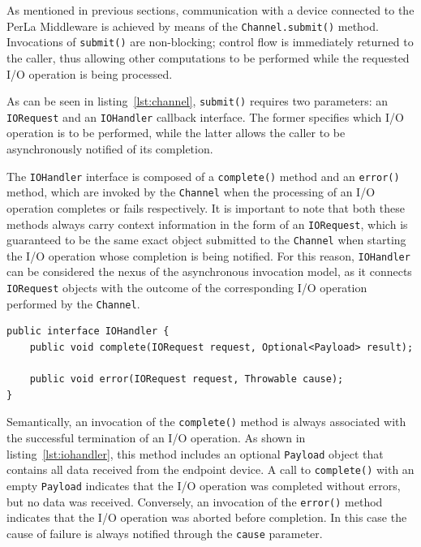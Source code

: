As mentioned in previous sections, communication with a device connected to the PerLa Middleware is achieved by means of the \texttt{Channel.submit()} method. Invocations of \texttt{submit()} are non-blocking; control flow is immediately returned to the caller, thus allowing other computations to be performed while the requested I/O operation is being processed.

As can be seen in listing~\ref{lst:channel}, \texttt{submit()} requires two parameters: an \texttt{IORequest} and an \texttt{IOHandler} callback interface. The former specifies which I/O operation is to be performed, while the latter allows the caller to be asynchronously notified of its completion.

The \texttt{IOHandler} interface is composed of a \texttt{complete()} method and an \texttt{error()} method, which are invoked by the \texttt{Channel} when the processing of an I/O operation completes or fails respectively. It is important to note that both these methods always carry context information in the form of an \texttt{IORequest}, which is guaranteed to be the same exact object submitted to the \texttt{Channel} when starting the I/O operation whose completion is being notified. For this reason, \texttt{IOHandler} can be considered the nexus of the asynchronous invocation model, as it connects \texttt{IORequest} objects with the outcome of the corresponding I/O operation performed by the \texttt{Channel}.

\lstset{language=Java}
\begin{lstlisting}[float,floatplacement=H,caption=The IOHandler interface,label={lst:iohandler}]
public interface IOHandler {
	public void complete(IORequest request, Optional<Payload> result);
	
	public void error(IORequest request, Throwable cause);
}
\end{lstlisting}

Semantically, an invocation of the \texttt{complete()} method is always associated with the successful termination of an I/O operation. As shown in listing~\ref{lst:iohandler}, this method includes an optional \texttt{Payload} object that contains all data received from the endpoint device. A call to \texttt{complete()} with an empty \texttt{Payload} indicates that the I/O operation was completed without errors, but no data was received. Conversely, an invocation of the \texttt{error()} method indicates that the I/O operation was aborted before completion. In this case the cause of failure is always notified through the \texttt{cause} parameter.

